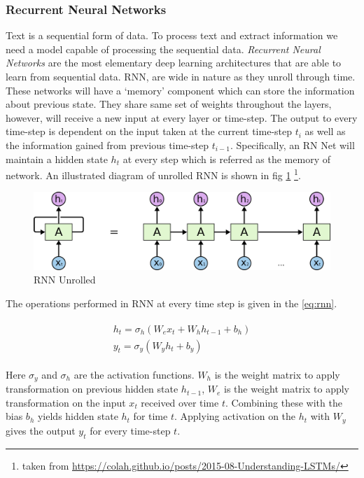 \subsubsection{Recurrent Neural Networks} \label{sec:rnn}
Text is a sequential form of data. To process text and extract information we need a model capable of processing the sequential data. \textit{Recurrent Neural Networks} \cite{elman1990finding} are the most elementary deep learning architectures that are able to learn from sequential data. RNN, are wide in nature as they unroll through time. These networks will have a `memory' component which can store the information about previous state. They share same set of weights throughout the layers, however, will receive a new input at every layer or time-step. The output to every time-step is dependent on the input taken at the current time-step $t_{i}$ as well as the information gained from previous time-step $t_{i-1}$. Specifically, an RN Net will maintain a hidden state $h_{t}$ at every step which is referred as the memory of network. An illustrated diagram of unrolled RNN is shown in fig \cref{fig:rnn_unrolled} \footnote{taken from \url{https://colah.github.io/posts/2015-08-Understanding-LSTMs/}}.

\begin{figure}
    \centering
    \includegraphics[width=\textwidth]{images/RNN-unrolled.png}
    \caption{RNN Unrolled}
    \label{fig:rnn_unrolled}
\end{figure}

The operations performed in RNN at every time step is given in the \cref{eq:rnn}.

\begin{align}\label{eq:rnn}
    \begin{gathered}
        h_{t} = \sigma_{h}(W_{e}x_{t} + W_{h}h_{t-1} + b_{h}) \\
        y_{t} = \sigma_{y}(W_{y}h_{t} + b_{y})
    \end{gathered}
\end{align}

Here $\sigma_{y}$ and $\sigma_{h}$ are the activation functions. $W_{h}$ is the weight matrix to apply transformation on previous hidden state $h_{t-1}$, $W_{e}$ is the weight matrix to apply transformation on the input $x_{t}$ received over time $t$. Combining these with the bias $b_{h}$ yields hidden state $h_t$ for time $t$. Applying activation on the $h_{t}$ with $W_{y}$ gives the output $y_t$ for every time-step $t$.


